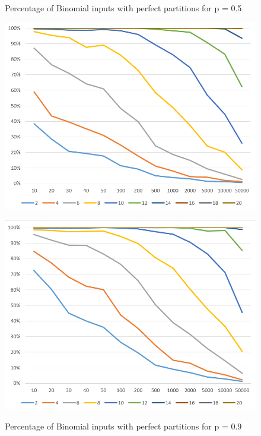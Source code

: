 \begin{figure}[h]
      \centering
      \begin{minipage}[b]{0.45\textwidth}
            \caption{Percentage of Binomial inputs with perfect partitions for p = 0.5}
            \includegraphics[width=\textwidth]{figures/images/solvabilityOfInputs/solvability0_5.png}
      \end{minipage}
      \hspace{0.75cm}
      \begin{minipage}[b]{0.45\textwidth}
            \caption{Percentage of Binomial inputs with perfect partitions for p = 0.9}
            \includegraphics[width=\textwidth]{figures/images/solvabilityOfInputs/solvability0_9.png}\label{fig:lastBinPercentage2}
      \end{minipage}
\end{figure}

